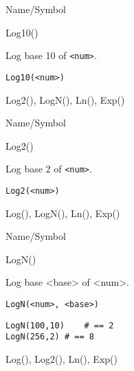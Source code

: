 \rl



\begin{desc}{Name/Symbol}
\item[Name/Symbol]	Log10()

\item[Description]	Log base 10 of \verb+<num>+.

\item[Usage]
\begin{verbatim}
Log10(<num>)
\end{verbatim}

\item[Example]	

\item[See Also]	Log2(), LogN(), Ln(), Exp()
\end{desc}

\rl


\begin{desc}{Name/Symbol}
\item[Name/Symbol]	Log2()

\item[Description]	Log base 2 of \verb+<num>+.

\item[Usage]
\begin{verbatim}
Log2(<num>)
\end{verbatim}

\item[Example]	

\item[See Also]	Log(), LogN(), Ln(), Exp()
\end{desc}

\rl


\begin{desc}{Name/Symbol}
\item[Name/Symbol]	LogN()

\item[Description]	Log base <base> of <num>.

\item[Usage]
\begin{verbatim}
LogN(<num>, <base>)
\end{verbatim}

\item[Example]
\begin{verbatim}
LogN(100,10)	# == 2
LogN(256,2)	# == 8
\end{verbatim}

\item[See Also]	Log(), Log2(), Ln(), Exp()
\end{desc}

